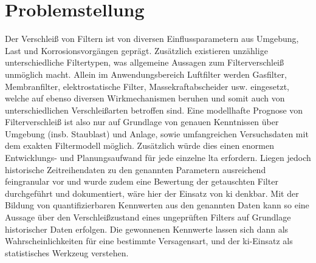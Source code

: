     \section{Problemstellung}
    Der Verschleiß von Filtern ist von diversen Einflussparametern aus Umgebung, Last und Korrosionsvorgängen geprägt. Zusätzlich existieren unzählige unterschiedliche Filtertypen, was allgemeine Aussagen zum Filterverschleiß unmöglich macht. Allein im Anwendungsbereich Luftfilter werden Gasfilter, Membranfilter, elektrostatische Filter, Massekraftabscheider usw. eingesetzt, welche auf ebenso diversen Wirkmechanismen beruhen und somit auch von unterschiedlichen Verschleißarten betroffen sind. \newline 
    Eine modellhafte Prognose von Filterverschleiß ist also nur auf Grundlage von genauen Kenntnissen über Umgebung (insb. Staublast) und Anlage, sowie umfangreichen Versuchsdaten mit dem exakten Filtermodell möglich. Zusätzlich würde dies einen enormen Entwicklungs- und Planungsaufwand für jede einzelne \ac{lta} erfordern. Liegen jedoch historische Zeitreihendaten zu den genannten Parametern ausreichend feingranular vor und wurde zudem eine Bewertung der getauschten Filter durchgeführt und dokumentiert, wäre hier der Einsatz von \ac{ki} denkbar. Mit der Bildung von quantifizierbaren Kennwerten aus den genannten Daten kann so eine Aussage über den Verschleißzustand eines ungeprüften Filters auf Grundlage historischer Daten erfolgen. Die gewonnenen Kennwerte lassen sich dann als Wahrscheinlichkeiten für eine bestimmte Versagensart, und der \ac{ki}-Einsatz als statistisches Werkzeug verstehen.
